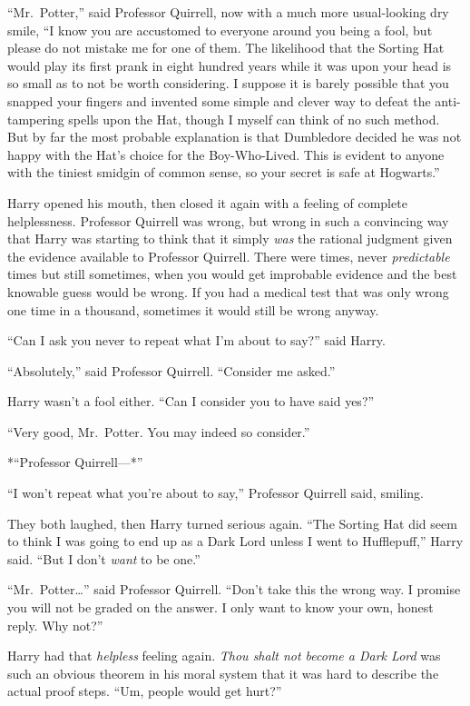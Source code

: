 ``Mr.~Potter,'' said Professor Quirrell, now with a much more
usual-looking dry smile, ``I know you are accustomed to everyone around
you being a fool, but please do not mistake me for one of them. The
likelihood that the Sorting Hat would play its first prank in eight
hundred years while it was upon your head is so small as to not be worth
considering. I suppose it is barely possible that you snapped your
fingers and invented some simple and clever way to defeat the
anti-tampering spells upon the Hat, though I myself can think of no such
method. But by far the most probable explanation is that Dumbledore
decided he was not happy with the Hat's choice for the Boy-Who-Lived.
This is evident to anyone with the tiniest smidgin of common sense, so
your secret is safe at Hogwarts.''

Harry opened his mouth, then closed it again with a feeling of complete
helplessness. Professor Quirrell was wrong, but wrong in such a
convincing way that Harry was starting to think that it simply
\emph{was} the rational judgment given the evidence available to
Professor Quirrell. There were times, never \emph{predictable} times but
still sometimes, when you would get improbable evidence and the best
knowable guess would be wrong. If you had a medical test that was only
wrong one time in a thousand, sometimes it would still be wrong anyway.

``Can I ask you never to repeat what I'm about to say?'' said Harry.

``Absolutely,'' said Professor Quirrell. ``Consider me asked.''

Harry wasn't a fool either. ``Can I consider you to have said yes?''

``Very good, Mr.~Potter. You may indeed so consider.''

*``Professor Quirrell---*''

``I won't repeat what you're about to say,'' Professor Quirrell said,
smiling.

They both laughed, then Harry turned serious again. ``The Sorting Hat
did seem to think I was going to end up as a Dark Lord unless I went to
Hufflepuff,'' Harry said. ``But I don't \emph{want} to be one.''

``Mr.~Potter\ldots{}'' said Professor Quirrell. ``Don't take this the
wrong way. I promise you will not be graded on the answer. I only want
to know your own, honest reply. Why not?''

Harry had that \emph{helpless} feeling again. \emph{Thou shalt not
become a Dark Lord} was such an obvious theorem in his moral system that
it was hard to describe the actual proof steps. ``Um, people would get
hurt?''

